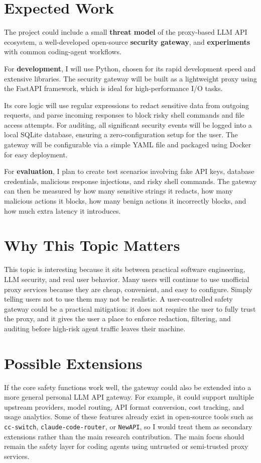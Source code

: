 \documentclass[11pt]{article}
\begin{document}
\section*{Expected Work}

The project could include a small \textbf{threat model} of the proxy-based LLM API ecosystem, a well-developed open-source \textbf{security gateway}, and \textbf{experiments} with common coding-agent workflows.

For \textbf{development}, I will use Python, chosen for its rapid development speed and extensive libraries. The security gateway will be built as a lightweight proxy using the FastAPI framework, which is ideal for high-performance I/O tasks.

Its core logic will use regular expressions to redact sensitive data from outgoing requests, and parse incoming responses to block risky shell commands and file access attempts. For auditing, all significant security events will be logged into a local SQLite database, ensuring a zero-configuration setup for the user. The gateway will be configurable via a simple YAML file and packaged using Docker for easy deployment.

For \textbf{evaluation}, I plan to create test scenarios involving fake API keys, database credentials, malicious response injections, and risky shell commands. The gateway can then be measured by how many sensitive strings it redacts, how many malicious actions it blocks, how many benign actions it incorrectly blocks, and how much extra latency it introduces.

\section*{Why This Topic Matters}

This topic is interesting because it sits between practical software engineering, LLM security, and real user behavior. Many users will continue to use unofficial proxy services because they are cheap, convenient, and easy to configure. Simply telling users not to use them may not be realistic. A user-controlled safety gateway could be a practical mitigation: it does not require the user to fully trust the proxy, and it gives the user a place to enforce redaction, filtering, and auditing before high-risk agent traffic leaves their machine.

\section*{Possible Extensions}

If the core safety functions work well, the gateway could also be extended into a more general personal LLM API gateway. For example, it could support multiple upstream providers, model routing, API format conversion, cost tracking, and usage analytics. Some of these features already exist in open-source tools such as \texttt{cc-switch}, \texttt{claude-code-router}, or \texttt{NewAPI}, so I would treat them as secondary extensions rather than the main research contribution. The main focus should remain the safety layer for coding agents using untrusted or semi-trusted proxy services.
\end{document}
